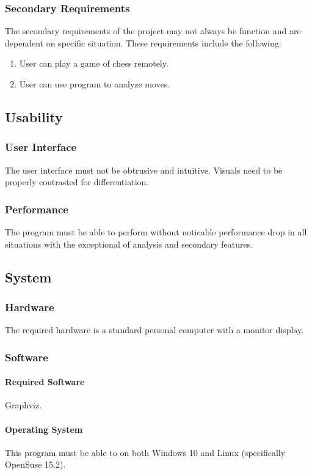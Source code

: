 \documentclass{article}
\begin{document}
\subsubsection{Secondary Requirements}
The secondary requirements of the project may not always be function and are dependent on specific situation. These requirements include the following:
\begin{enumerate}
\item User can play a game of chess remotely.
\item User can use program to analyze moves.
\end{enumerate}
\subsection{Usability}
\subsubsection{User Interface}
The user interface must not be obtrusive and intuitive. Visuals need to be properly contrasted for differentiation. 
\subsubsection{Performance}
The program must be able to perform without noticable performance drop in all situations with the exceptional of analysis and secondary features.
\subsection{System}
\subsubsection{Hardware}
The required hardware is a standard personal computer with a monitor display.
\subsubsection{Software}
\paragraph{Required Software}
Graphviz.
\paragraph{Operating System}
This program must be able to on both Windows 10 and Linux (specifically OpenSuse 15.2).
\end{document}
